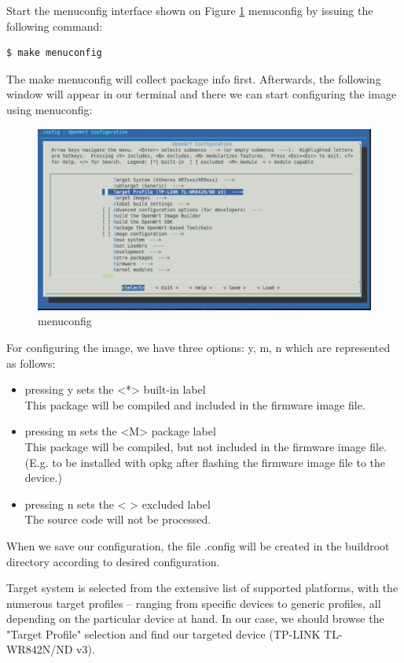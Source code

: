 Start the menuconfig interface shown on Figure \ref{fig_menuconfig} menuconfig by issuing the following command:
\begin{lstlisting}[columns=fixed,basicstyle=\ttfamily\footnotesize,tabsize=4,backgroundcolor=\color{yellow!10}]
$ make menuconfig
\end{lstlisting}
The make menuconfig will collect package info first. %
Afterwards, the following window will appear in our terminal and there we can start configuring the image using menuconfig:
\begin{figure}[h]
    \centering
    \includegraphics[scale=0.6]{figures/make_menuconfig.pdf}
    \caption{menuconfig}
    \label{fig_menuconfig}
\end{figure}

For configuring the image, we have three options: y, m, n which are represented as follows:
\begin{itemize}
\item pressing y sets the <*> built-in label\\
This package will be compiled and included in the firmware image file.
\item pressing m sets the <M> package label\\
This package will be compiled, but not included in the firmware image file. (E.g. to be installed with opkg after flashing the firmware image file to the device.)
\item pressing n sets the < > excluded label\\
The source code will not be processed.
\end{itemize}
When we save our configuration, the file .config will be created in the buildroot directory according to desired configuration.

Target system is selected from the extensive list of supported platforms, with the numerous target profiles – ranging from specific devices to generic profiles, all depending on the particular device at hand.
In our case, we should browse the "Target Profile" selection and find our targeted device (TP-LINK TL-WR842N/ND v3).

